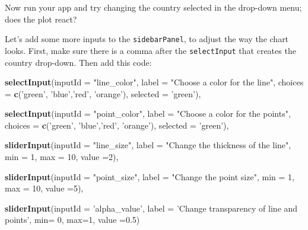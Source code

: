 \documentclass[]{book}
\newenvironment{Shaded}{\begin{snugshade}}{\end{snugshade}}
\newcommand{\DataTypeTok}[1]{\textcolor[rgb]{0.13,0.29,0.53}{#1}}
\newcommand{\DecValTok}[1]{\textcolor[rgb]{0.00,0.00,0.81}{#1}}
\newcommand{\FloatTok}[1]{\textcolor[rgb]{0.00,0.00,0.81}{#1}}
\newcommand{\KeywordTok}[1]{\textcolor[rgb]{0.13,0.29,0.53}{\textbf{#1}}}
\newcommand{\NormalTok}[1]{#1}
\newcommand{\StringTok}[1]{\textcolor[rgb]{0.31,0.60,0.02}{#1}}
\begin{document}
Now run your app and try changing the country selected in the drop-down menu; does the plot react?

Let's add some more inputs to the \texttt{sidebarPanel}, to adjust the way the chart looks. First, make sure there is a comma after the \texttt{selectInput} that creates the country drop-down. Then add this code:

\begin{Shaded}
\begin{Highlighting}[]
\KeywordTok{selectInput}\NormalTok{(}\DataTypeTok{inputId =} \StringTok{"line_color"}\NormalTok{,}
            \DataTypeTok{label =} \StringTok{"Choose a color for the line"}\NormalTok{,}
            \DataTypeTok{choices =} \KeywordTok{c}\NormalTok{(}\StringTok{'green'}\NormalTok{, }\StringTok{'blue'}\NormalTok{,}\StringTok{'red'}\NormalTok{, }\StringTok{'orange'}\NormalTok{),}
            \DataTypeTok{selected =} \StringTok{'green'}\NormalTok{),}

\KeywordTok{selectInput}\NormalTok{(}\DataTypeTok{inputId =} \StringTok{"point_color"}\NormalTok{,}
            \DataTypeTok{label =} \StringTok{"Choose a color for the points"}\NormalTok{,}
            \DataTypeTok{choices =} \KeywordTok{c}\NormalTok{(}\StringTok{'green'}\NormalTok{, }\StringTok{'blue'}\NormalTok{,}\StringTok{'red'}\NormalTok{, }\StringTok{'orange'}\NormalTok{),}
            \DataTypeTok{selected =} \StringTok{'green'}\NormalTok{),}

\KeywordTok{sliderInput}\NormalTok{(}\DataTypeTok{inputId =} \StringTok{"line_size"}\NormalTok{,}
            \DataTypeTok{label =} \StringTok{"Change the thickness of the line"}\NormalTok{,}
            \DataTypeTok{min =} \DecValTok{1}\NormalTok{,}
            \DataTypeTok{max =} \DecValTok{10}\NormalTok{,}
            \DataTypeTok{value =}\DecValTok{2}\NormalTok{),}

\KeywordTok{sliderInput}\NormalTok{(}\DataTypeTok{inputId =} \StringTok{"point_size"}\NormalTok{,}
            \DataTypeTok{label =} \StringTok{"Change the point size"}\NormalTok{,}
            \DataTypeTok{min =} \DecValTok{1}\NormalTok{,}
            \DataTypeTok{max =} \DecValTok{10}\NormalTok{,}
            \DataTypeTok{value =}\DecValTok{5}\NormalTok{),}

\KeywordTok{sliderInput}\NormalTok{(}\DataTypeTok{inputId =} \StringTok{'alpha_value'}\NormalTok{,}
            \DataTypeTok{label =} \StringTok{'Change transparency of line and points'}\NormalTok{,}
            \DataTypeTok{min=} \DecValTok{0}\NormalTok{,}
            \DataTypeTok{max=}\DecValTok{1}\NormalTok{,}
            \DataTypeTok{value =}\FloatTok{0.5}\NormalTok{)}
\end{Highlighting}
\end{Shaded}
\end{document}
